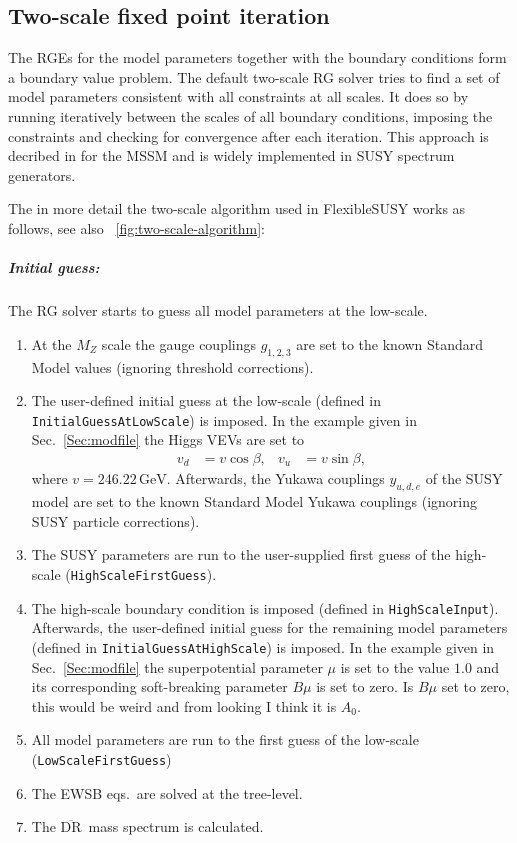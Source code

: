 \documentclass[final,3p,11pt,pdflatex]{elsarticle}
\newcommand{\fs}{FlexibleSUSY\xspace}
\newcommand{\code}[1]{\lstinline|#1|}  %
\newcommand{\textoverline}[1]{$\overline{\mbox{#1}}$}
\newcommand{\DRbar}{\textoverline{DR}\xspace}
\newcommand{\unit}[1]{\,\text{#1}}      %
\newcommand{\figref}[1]{\figurename~\ref{#1}}
\newcommand{\secref}[1]{Sec.~\ref{#1}}
\begin{document}
\subsection{Two-scale fixed point iteration}

The RGEs for the model parameters together with the boundary
conditions form a boundary value problem.  The default two-scale RG
solver tries to find a set of model parameters consistent with all
constraints at all scales.  It does so by running iteratively between
the scales of all boundary conditions, imposing the constraints and
checking for convergence after each iteration.  This approach is
decribed in \cite{Barger:1993gh} for the MSSM and is widely
implemented in SUSY spectrum generators.

The in more detail the two-scale algorithm used in \fs works as
follows, see also \figref{fig:two-scale-algorithm}:
%
\subparagraph{Initial guess:} The RG solver starts to guess all model
parameters at the low-scale.
%
\begin{enumerate}
\item At the $M_Z$ scale the gauge couplings $g_{1,2,3}$ are set to
  the known Standard Model values (ignoring threshold corrections).
\item The user-defined initial guess at the low-scale (defined in
  \code{InitialGuessAtLowScale}) is imposed.  In the example given in
  \secref{Sec:modfile} the Higgs VEVs are set to
  \begin{align}
    v_d &= v \cos\beta, & v_u &= v \sin\beta ,
  \end{align}
  where $v=246.22\unit{GeV}$.  Afterwards, the Yukawa couplings
  $y_{u,d,e}$ of the SUSY model are set to the known Standard Model
  Yukawa couplings (ignoring SUSY particle corrections).
\item The SUSY parameters are run to the user-supplied first guess of
  the high-scale (\code{HighScaleFirstGuess}).
\item The high-scale boundary condition is imposed (defined in
  \code{HighScaleInput}).  Afterwards, the user-defined initial guess
  for the remaining model parameters (defined in
  \code{InitialGuessAtHighScale}) is imposed.  In the example given in
  \secref{Sec:modfile} the superpotential parameter $\mu$ is set to
  the value $1.0$ and its corresponding soft-breaking parameter $B\mu$
  is set to zero. {\color{red} Is $B\mu$ set to zero, this would be weird and from looking I think it is $A_0$.}
\item All model parameters are run to the first guess of the low-scale
  (\code{LowScaleFirstGuess})
\item The EWSB eqs.\ are solved at the tree-level.
\item The \DRbar\ mass spectrum is calculated.
\end{enumerate}
\end{document}
